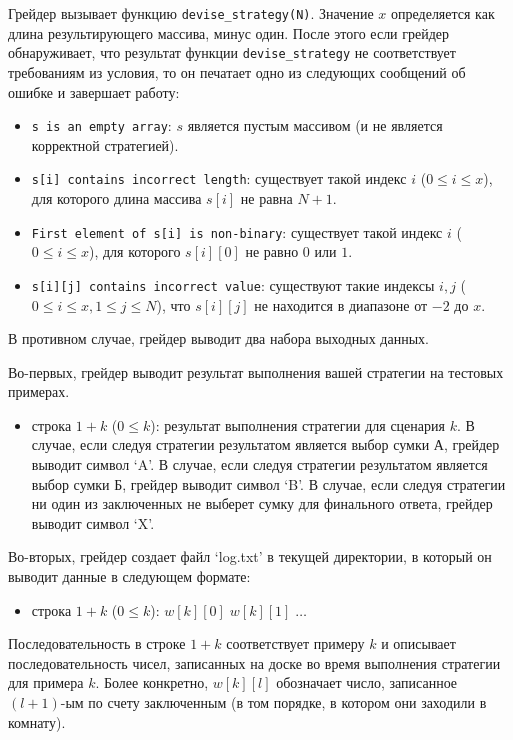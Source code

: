Грейдер вызывает функцию \texttt{devise\_strategy(N)}.
Значение $x$ определяется как длина результирующего массива, минус один.
После этого если грейдер обнаруживает, что результат функции \texttt{devise\_strategy} не соответствует требованиям из условия, то он печатает одно из следующих сообщений об ошибке и завершает работу:

\begin{itemize}
    \item \texttt{s is an empty array}: $s$ является пустым массивом (и не является корректной стратегией).
\item \texttt{s[i] contains incorrect length}: существует такой индекс $i$ ($0 \le i \le x$), для которого длина массива $s[i]$ не равна $N + 1$.
\item \texttt{First element of s[i] is non-binary}: существует такой индекс $i$ ($0 \le i \le x$), для которого $s[i][0]$ не равно $0$ или $1$.
\item \texttt{s[i][j] contains incorrect value}: существуют такие индексы $i, j$ ($0 \le i \le x, 1 \le j \le N$), что $s[i][j]$ не находится в диапазоне от $-2$ до $x$.

\end{itemize}


В противном случае, грейдер выводит два набора выходных данных.

Во-первых, грейдер выводит результат выполнения вашей стратегии на тестовых примерах.
\begin{itemize}
    \item  строка $1 + k$ ($0 \le k$): результат выполнения стратегии для сценария $k$.
В случае, если следуя стратегии результатом является выбор сумки А, грейдер выводит символ `A'.
В случае, если следуя стратегии результатом является выбор сумки Б, грейдер выводит символ `B'.
В случае, если следуя стратегии ни один из заключенных не выберет сумку для финального ответа, грейдер выводит символ `X'.
\end{itemize}

Во-вторых, грейдер создает файл `log.txt' в текущей директории, в который он выводит данные в следующем формате:

\begin{itemize}
    \item строка $1 + k$ ($0 \le k$): $w[k][0] \; w[k][1] \; \ldots$
\end{itemize}


Последовательность в строке $1 + k$ соответствует примеру $k$ и описывает последовательность чисел, записанных на доске во время выполнения стратегии для примера $k$. Более конкретно, $w[k][l]$ обозначает число, записанное $(l+1)$-ым по счету заключенным (в том порядке, в котором они заходили в комнату).
